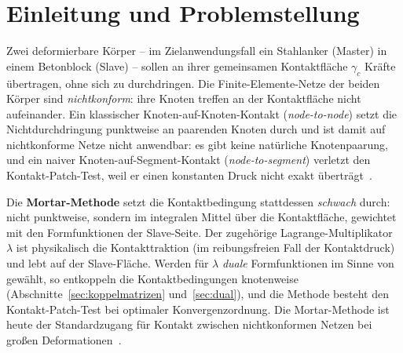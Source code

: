 \documentclass[a4paper,11pt]{article}
\def\bm#1{#1}%
\let\stdsection\section
\renewcommand{\section}{\clearpage\stdsection}
\begin{document}
\section{Einleitung und Problemstellung}
\label{sec:einleitung}

Zwei deformierbare Körper -- im Zielanwendungsfall ein Stahlanker (Master) in einem Betonblock
(Slave) -- sollen an ihrer gemeinsamen Kontaktfläche $\gamma_c$ Kräfte übertragen, ohne sich zu
durchdringen. Die Finite-Elemente-Netze der beiden Körper sind \emph{nichtkonform}: ihre Knoten
treffen an der Kontaktfläche nicht aufeinander. Ein klassischer Knoten-auf-Knoten-Kontakt
(\emph{node-to-node}) setzt die Nichtdurchdringung punktweise an paarenden Knoten durch und ist
damit auf nichtkonforme Netze nicht anwendbar: es gibt keine natürliche Knotenpaarung, und ein
naiver Knoten-auf-Segment-Kontakt (\emph{node-to-segment}) verletzt den Kontakt-Patch-Test, weil er
einen konstanten Druck nicht exakt überträgt~\citep{wriggers}.

Die \textbf{Mortar-Methode} setzt die Kontaktbedingung stattdessen \emph{schwach} durch: nicht
punktweise, sondern im integralen Mittel über die Kontaktfläche, gewichtet mit den Formfunktionen
der Slave-Seite. Der zugehörige Lagrange-Multiplikator $\bm\lambda$ ist physikalisch die
Kontakttraktion (im reibungsfreien Fall der Kontaktdruck) und lebt auf der Slave-Fläche. Werden für
$\bm\lambda$ \emph{duale} Formfunktionen im Sinne von \citet{wohlmuth2000} gewählt, so
entkoppeln die Kontaktbedingungen knotenweise (Abschnitte~\ref{sec:koppelmatrizen}
und~\ref{sec:dual}), und die Methode besteht den Kontakt-Patch-Test bei optimaler
Konvergenzordnung. Die Mortar-Methode ist heute der Standardzugang für Kontakt zwischen
nichtkonformen Netzen bei großen Deformationen~\citep{puso2004,popp2010,farah}.
\end{document}
